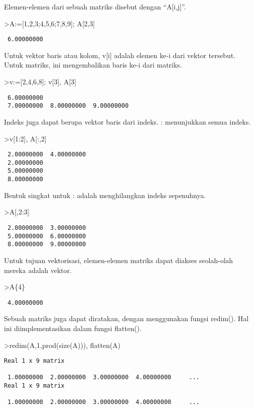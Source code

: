 \documentclass[
]{book}
\begin{document}
Elemen-elemen dari sebuah matriks disebut dengan ``A{[}i,j{]}''.

\textgreater A:={[}1,2,3;4,5,6;7,8,9{]}; A{[}2,3{]}

\begin{verbatim}
 6.00000000 
\end{verbatim}

Untuk vektor baris atau kolom, v{[}i{]} adalah elemen ke-i dari vektor tersebut. Untuk matriks, ini mengembalikan baris ke-i dari matriks.

\textgreater v:={[}2,4,6,8{]}; v{[}3{]}, A{[}3{]}

\begin{verbatim}
 6.00000000 
 7.00000000  8.00000000  9.00000000 
\end{verbatim}

Indeks juga dapat berupa vektor baris dari indeks. : menunjukkan semua indeks.

\textgreater v{[}1:2{]}, A{[}:,2{]}

\begin{verbatim}
 2.00000000  4.00000000 
 2.00000000 
 5.00000000 
 8.00000000 
\end{verbatim}

Bentuk singkat untuk : adalah menghilangkan indeks sepenuhnya.

\textgreater A{[},2:3{]}

\begin{verbatim}
 2.00000000  3.00000000 
 5.00000000  6.00000000 
 8.00000000  9.00000000 
\end{verbatim}

Untuk tujuan vektorisasi, elemen-elemen matriks dapat diakses seolah-olah mereka adalah vektor.

\textgreater A\{4\}

\begin{verbatim}
 4.00000000 
\end{verbatim}

Sebuah matriks juga dapat diratakan, dengan menggunakan fungsi redim(). Hal ini diimplementasikan dalam fungsi flatten().

\textgreater redim(A,1,prod(size(A))), flatten(A)

\begin{verbatim}
Real 1 x 9 matrix

 1.00000000  2.00000000  3.00000000  4.00000000     ...
Real 1 x 9 matrix

 1.00000000  2.00000000  3.00000000  4.00000000     ...
\end{verbatim}
\end{document}
